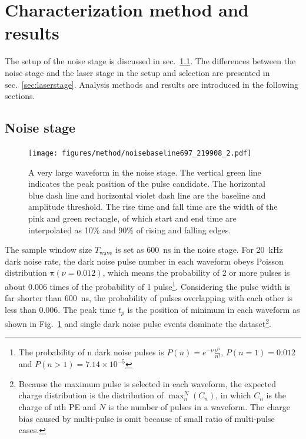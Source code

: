 \section{Characterization method and results}
\label{Method}
The setup of the noise stage is discussed in sec.~\ref{sec:noisestage}. The differences between the noise stage and the laser stage in the setup and selection are presented in sec.~\ref{sec:laserstage}. Analysis methods and results are introduced in the following sections.
\subsection{Noise stage}
\label{sec:noisestage}
\begin{figure}[!htbp]
    \centering
    \texttt{[image: figures/method/noisebaseline697\_219908\_2.pdf]}
    \caption{A very large waveform in the noise stage. The vertical green line indicates the peak position of the pulse candidate. The horizontal blue dash line and horizontal violet dash line are the baseline and amplitude threshold. The rise time and fall time are the width of the pink and green rectangle, of which start and end time are interpolated as 10\% and 90\% of rising and falling edges.}
    \label{fig:baseline1}
\end{figure}

The sample window size $T_{\mathrm{wave}}$ is set as \SI{600}{ns} in the noise stage. For \SI{20}{kHz} dark noise rate, the dark noise pulse number in each waveform obeys Poisson distribution $\mathrm{\pi}(\nu=0.012)$, which means the probability of 2 or more pulses is about 0.006 times of the probability of 1 pulse\footnote{The probability of n dark noise pulses is $P(n)=e^{-\nu}\frac{\nu^n}{n!}$, $P(n=1)=0.012$ and $P(n>1)=7.14\times10^{-5}$}. Considering the pulse width is far shorter than \SI{600}{ns}, the probability of pulses overlapping with each other is less than 0.006. The peak time $t_p$ is the position of minimum in each waveform as shown in Fig.~\ref{fig:baseline1} and single dark noise pulse events dominate the dataset\footnote{Because the maximum pulse is selected in each waveform, the expected charge distribution is the distribution of $\max_n^N(C_n)$, in which $C_n$ is the charge of nth PE and $N$ is the number of pulses in a waveform. The charge bias caused by multi-pulse is omit because of small ratio of multi-pulse cases.}.

